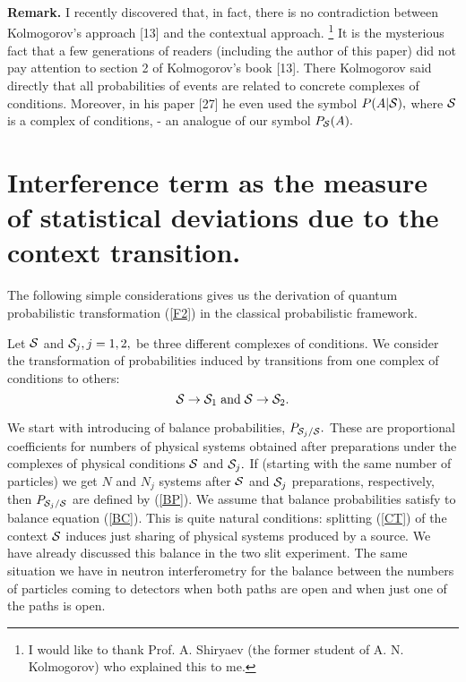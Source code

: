 \documentclass[12pt,oneside,final,a4paper]{article}
\begin{document}
{\bf Remark.}  {\small  I recently discovered that, in fact, there is no contradiction 
between Kolmogorov's approach [13] and the contextual approach.
\footnote{I would like to thank Prof. A. Shiryaev (the former student of A. N. Kolmogorov) who explained this to me.}
It is the mysterious fact that a few generations of readers (including the author of this paper) 
did not pay attention to section 2 of Kolmogorov's book [13]. There Kolmogorov said directly 
that all probabilities of events are related to concrete complexes of conditions. Moreover, in his 
paper [27] he even used the symbol $P(A|{\cal S}),$ where ${\cal S}$ is a complex of conditions,
- an analogue of our symbol $P_{{\cal S}}(A).$}

\section{Interference term as the measure of statistical deviations due to the context transition.}
The following simple considerations gives us the derivation of 
quantum probabilistic transformation (\ref{F2}) in the 
classical probabilistic framework.  

Let ${\cal S}$ and ${\cal S}_j, j=1,2,$ be three
different complexes of conditions. We consider the transformation of probabilities induced by transitions 
from one complex of conditions to others: 
\begin{equation}
\label{CT}
{\cal S} \rightarrow {\cal S}_1\; \mbox{and}\; {\cal S} \rightarrow {\cal S}_2.
\end{equation}


We start with introducing of balance probabilities,
$P_{{\cal S}_j/{\cal S}}.$  These are proportional coefficients for numbers of physical systems
obtained after preparations under the complexes of physical conditions ${\cal S}$ and ${\cal S}_j.$
If (starting with the same number of particles)  we get $N$ and $N_j$ systems after  ${\cal S}$
and ${\cal S}_j$ preparations, respectively, then $P_{{\cal S}_j/{\cal S}}$  are defined by
(\ref{BP}). We assume that balance probabilities satisfy to balance equation (\ref{BC}).
This is quite natural conditions: splitting (\ref{CT}) of the context ${\cal S}$ 
induces just  sharing of physical systems produced by a source. We have already
discussed this balance in the two slit experiment. The same situation we have 
in neutron interferometry  for the balance between the numbers of particles coming to detectors
when both paths are open and when just one of the paths is open.
\end{document}
